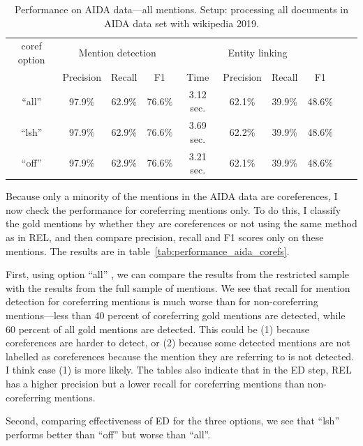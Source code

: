 \documentclass[a4paper,11pt]{article}
\numberwithin{equation}{section} %
\begin{document}
\begin{table}
 \begin{tabular}{c c c c c c c c c c}
\hline
 coref option & \multicolumn{3}{c}{Mention detection} & \multicolumn{4}{c}{Entity linking}  \\
        & Precision & Recall & F1 & Time & Precision & Recall & F1 \\
 \hline 
 ``all'' & 97.9\% & 62.9\% & 76.6\% & 3.12 sec. & 62.1\% & 39.9\% & 48.6\% \\  
 ``lsh'' & 97.9\% & 62.9\% & 76.6\% & 3.69 sec. & 62.2\% & 39.9\% & 48.6\% \\
 ``off'' & 97.9\% & 62.9\% & 76.6\% & 3.21 sec.  & 62.1\% & 39.9\% & 48.6\% \\ 
\hline 
\end{tabular}
\caption{Performance on AIDA data---all mentions. Setup: processing all documents in AIDA data set with wikipedia 2019.}
\label{tab:performance_aida_full}
\end{table}


Because only a minority of the mentions in the AIDA data are coreferences, I now check the performance for coreferring mentions only. To do this, I classify the gold mentions by whether they are coreferences or not using the same method as in REL, and then compare precision, recall and F1 scores only on these mentions. The results are in table~\ref{tab:performance_aida_corefs}. 

First, using option ``all'' , we can compare the results from the restricted sample with the results from the full sample of mentions. We see that recall for mention detection for coreferring mentions is much worse than for non-coreferring mentions---less than 40 percent of coreferring gold mentions are detected, while 60 percent of all gold mentions are detected. 
This could be (1) because coreferences are harder to detect, or (2) because some detected mentions are not labelled as coreferences because the mention they are referring to is not detected. I think case (1) is more likely.
The tables also indicate that in the ED step, REL has a higher precision but a lower recall for coreferring mentions than non-coreferring mentions. 

Second, comparing effectiveness of ED for the three options, we see that ``lsh'' performs better than ``off'' but worse than ``all''. 
\end{document}
